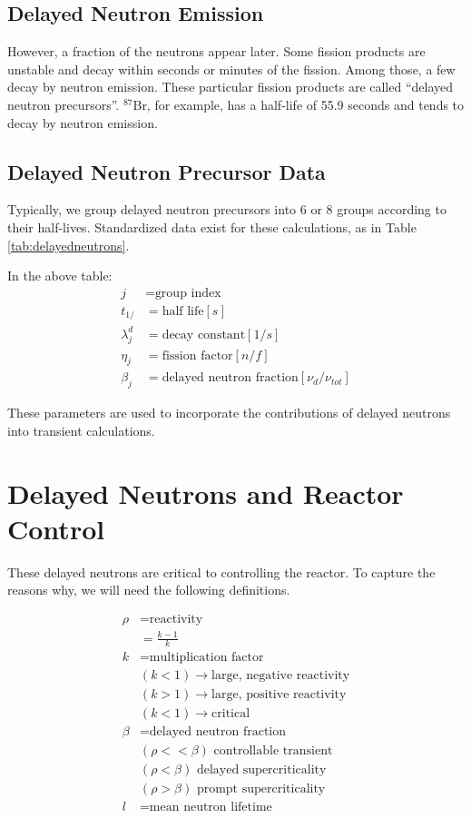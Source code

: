 \documentclass[12pt]{article}
\begin{document}
\subsection{Delayed Neutron Emission}
However, a fraction of the neutrons appear later. Some fission products are 
unstable and decay within seconds or minutes of the fission. Among those, a few 
decay by neutron emission. These particular fission products are called ``delayed 
neutron precursors''.  $^{87}$Br, for example, has a half-life of 55.9 seconds 
and tends to decay by neutron emission.

\subsection{Delayed Neutron Precursor Data}
Typically, we group delayed neutron precursors into 6 or 8 groups according to 
their half-lives. Standardized data exist for these calculations, as in Table 
\ref{tab:delayedneutrons}.



In the above table:
\begin{align}
j &= \mbox{group index}\\
t_{1/} &= \mbox{half life} [s]\\
\lambda_j^d &= \mbox{decay constant} [1/s]\\
\eta_j &= \mbox{fission factor} [n/f]\\
\beta_j &= \mbox{delayed neutron fraction} [\nu_d/\nu_{tot}]
\end{align}

These parameters are used to incorporate the contributions of delayed neutrons 
into transient calculations.

\section{Delayed Neutrons and Reactor Control}
These delayed neutrons are critical to controlling the reactor. 
To capture the reasons why, we will need the following definitions.

\begin{align}
\rho &= \mbox{reactivity}\\
&= \frac{k-1}{k}\\
k &= \mbox{multiplication factor}\\
&(k < 1) \rightarrow \mbox{large, negative reactivity}\\
&(k > 1) \rightarrow \mbox{large, positive reactivity}\\
&(k < 1) \rightarrow \mbox{critical}\\
\beta &= \mbox{delayed neutron fraction}\\
&(\rho << \beta) \mbox{ controllable transient}\\
&(\rho < \beta) \mbox{ delayed supercriticality}\\
&(\rho > \beta) \mbox{ prompt supercriticality}\\
l &= \mbox{mean neutron lifetime}
\end{align}
\end{document}
